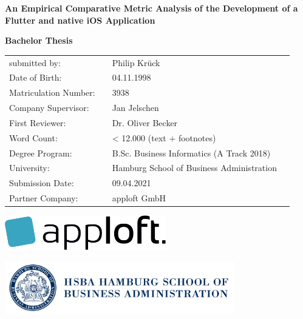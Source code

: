 \thispagestyle{empty}                  %


\begin{center}                         

\textbf{\Huge An Empirical Comparative Metric Analysis of the Development of a Flutter and native iOS Application}

\vspace{2cm}

\textbf{\Huge Bachelor Thesis}

\vspace{5cm}



\large\centering\doublespacing
\hspace{1.3cm}\begin{tabular}{p{4.2cm}p{0.3cm} p{8.7cm}l}
submitted by: & & Philip Krück\\
Date of Birth: & & 04.11.1998\\
Matriculation Number: & & 3938\\
Company Supervisor: & & Jan Jelschen\\
First Reviewer: & & Dr. Oliver Becker\\
Word Count: & & < 12.000 (text + footnotes) \\
Degree Program: & & B.Sc. Business Informatics (A Track 2018)\\
University: & & Hamburg School of Business Administration\\
Submission Date: & & 09.04.2021\\
Partner Company: & & apploft GmbH\\
\end{tabular}


\vspace{2cm}

\includegraphics[width=7cm]{images/apploft.png} %

\vspace{0.5cm}

\includegraphics[width=10cm]{images/hsba.png} %

\end{center}
